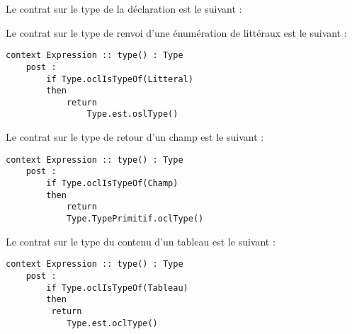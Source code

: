 Le contrat sur le type de la déclaration est le suivant :

Le contrat sur le type de renvoi d'une énumération de littéraux est le suivant :

\begin{lstlisting}[caption=Contrat \textsc{Ocl} sur le type de renvoi d'une énum de litéraux,captionpos=b,label={lst:type_énum},language=OCL]
context Expression :: type() : Type
	post :
		if Type.oclIsTypeOf(Litteral)
		then
			return
				Type.est.oslType()
\end{lstlisting}

Le contrat sur le type de retour d'un champ est le suivant :

\begin{lstlisting}[caption=Contrat \textsc{Ocl} sur le type de retour d'un champ,captionpos=b,label={lst:type_champ},language=OCL]
context Expression :: type() : Type
	post :
		if Type.oclIsTypeOf(Champ)
		then
			return
			Type.TypePrimitif.oclType()
\end{lstlisting}

Le contrat sur le type du contenu d'un tableau est le suivant :

\begin{lstlisting}[caption=Contrat \textsc{Ocl} sur le type de retour d'un tableau,captionpos=b,label={lst:type_tableau},language=OCL]
context Expression :: type() : Type
	post :
		if Type.oclIsTypeOf(Tableau)
		then
		 return
		 	Type.est.oclType()
\end{lstlisting}